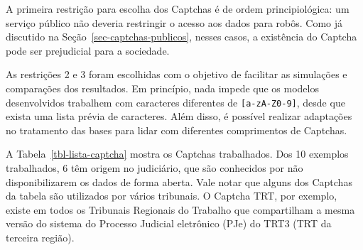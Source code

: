 \documentclass[12pt,twoside,brazilian]{book}
\begin{document}
A primeira restrição para escolha dos Captchas é de ordem
principiológica: um serviço público não deveria restringir o acesso aos
dados para robôs. Como já discutido na
Seção~\ref{sec-captchas-publicos}, nesses casos, a existência do Captcha
pode ser prejudicial para a sociedade.

As restrições 2 e 3 foram escolhidas com o objetivo de facilitar as
simulações e comparações dos resultados. Em princípio, nada impede que
os modelos desenvolvidos trabalhem com caracteres diferentes de
\texttt{{[}a-zA-Z0-9{]}}, desde que exista uma lista prévia de
caracteres. Além disso, é possível realizar adaptações no tratamento das
bases para lidar com diferentes comprimentos de Captchas.

A Tabela~\ref{tbl-lista-captcha} mostra os Captchas trabalhados. Dos 10
exemplos trabalhados, 6 têm origem no judiciário, que são conhecidos por
não disponibilizarem os dados de forma aberta. Vale notar que alguns dos
Captchas da tabela são utilizados por vários tribunais. O Captcha TRT,
por exemplo, existe em todos os Tribunais Regionais do Trabalho que
compartilham a mesma versão do sistema do Processo Judicial eletrônico
(PJe) do TRT3 (TRT da terceira região).
\end{document}
